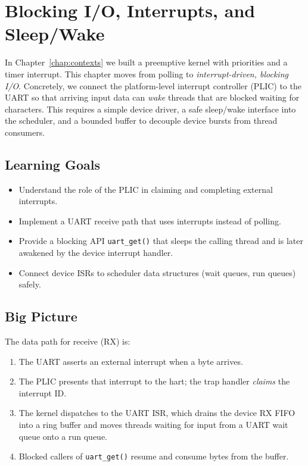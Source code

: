 \chapter{Blocking I/O, Interrupts, and Sleep/Wake}
\label{chap:blocking-io}

In Chapter~\ref{chap:contexts} we built a preemptive kernel with priorities and a timer interrupt.
This chapter moves from polling to \emph{interrupt-driven, blocking I/O}. Concretely, we connect the
platform-level interrupt controller (PLIC) to the UART so that arriving input data can \emph{wake}
threads that are blocked waiting for characters. This requires a simple device driver, a safe
sleep/wake interface into the scheduler, and a bounded buffer to decouple device bursts from thread
consumers.

\section{Learning Goals}

\begin{itemize}
  \item Understand the role of the PLIC in claiming and completing external interrupts.
  \item Implement a UART receive path that uses interrupts instead of polling.
  \item Provide a blocking API \texttt{uart\_get()} that sleeps the calling thread and is later
        awakened by the device interrupt handler.
  \item Connect device ISRs to scheduler data structures (wait queues, run queues) safely.
\end{itemize}

\section{Big Picture}

The data path for receive (RX) is:
\begin{enumerate}
  \item The UART asserts an external interrupt when a byte arrives.
  \item The PLIC presents that interrupt to the hart; the trap handler \emph{claims} the interrupt ID.
  \item The kernel dispatches to the UART ISR, which drains the device RX FIFO into a ring buffer and
        moves threads waiting for input from a UART wait queue onto a run queue.
  \item Blocked callers of \texttt{uart\_get()} resume and consume bytes from the buffer.
\end{enumerate}

